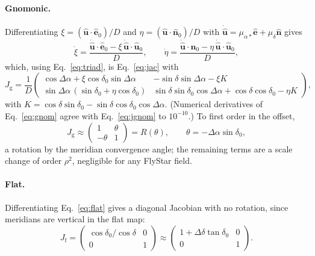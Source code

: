 \documentclass[11pt]{article}
\newcommand{\uvec}[1]{\hat{\mathbf #1}}
\begin{document}
\paragraph{Gnomonic.} Differentiating $\xi = (\uvec u\cdot\uvec e_0)/D$ and
$\eta = (\uvec u\cdot\uvec n_0)/D$ with $\dot{\uvec u} = \mu_{\alpha*}\uvec e + \mu_\delta\uvec n$ gives
\begin{equation}
  \dot\xi = \frac{\dot{\uvec u}\cdot\uvec e_0 - \xi\,\dot{\uvec u}\cdot\uvec u_0}{D}, \qquad
  \dot\eta = \frac{\dot{\uvec u}\cdot\uvec n_0 - \eta\,\dot{\uvec u}\cdot\uvec u_0}{D},
  \label{eq:pmvec}
\end{equation}
which, using Eq.~\eqref{eq:triad}, is Eq.~\eqref{eq:jac} with
\begin{equation}
  J_\mathrm{g} = \frac{1}{D}
  \begin{pmatrix}
    \cos\Delta\alpha + \xi\cos\delta_0\sin\Delta\alpha &
      -\sin\delta\sin\Delta\alpha - \xi K\\
    \sin\Delta\alpha\,(\sin\delta_0 + \eta\cos\delta_0) &
      \sin\delta\sin\delta_0\cos\Delta\alpha + \cos\delta\cos\delta_0 - \eta K
  \end{pmatrix},
  \label{eq:jgnom}
\end{equation}
with $K = \cos\delta\sin\delta_0 - \sin\delta\cos\delta_0\cos\Delta\alpha$.
(Numerical derivatives of Eq.~\eqref{eq:gnom} agree with
Eq.~\eqref{eq:jgnom} to $10^{-10}$.) To first order in the offset,
\begin{equation}
  J_\mathrm{g} \approx \begin{pmatrix} 1 & \theta \\ -\theta & 1\end{pmatrix}
  = R(\theta),\qquad \theta = -\Delta\alpha\sin\delta_0,
  \label{eq:jrot}
\end{equation}
a rotation by the meridian convergence angle; the remaining terms are a scale
change of order $\rho^2$, negligible for any FlyStar field.

\paragraph{Flat.} Differentiating Eq.~\eqref{eq:flat} gives a diagonal
Jacobian with no rotation, since meridians are vertical in the flat map:
\begin{equation}
  J_\mathrm{f} = \begin{pmatrix} \cos\delta_0/\cos\delta & 0 \\ 0 & 1 \end{pmatrix}
  \approx \begin{pmatrix} 1 + \Delta\delta\tan\delta_0 & 0 \\ 0 & 1 \end{pmatrix}.
  \label{eq:jflat}
\end{equation}
\end{document}
